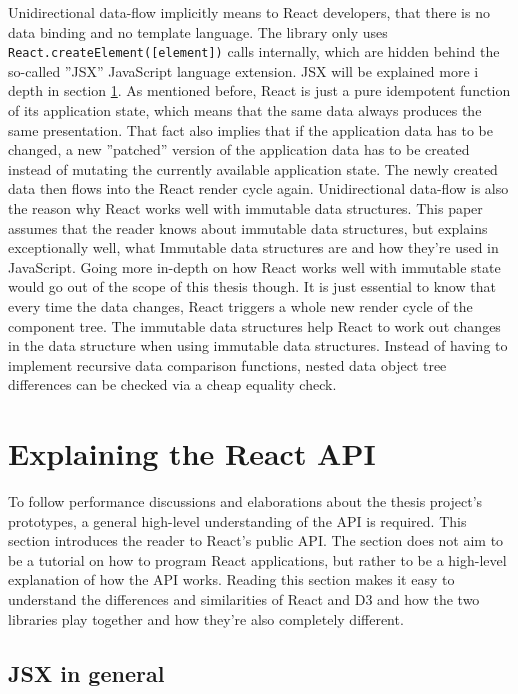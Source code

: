 Unidirectional data-flow implicitly means to React developers, that there is no data binding and no template language. The library only uses \texttt{React.createElement([element])} calls internally, which are hidden behind the so-called ''JSX'' JavaScript language extension. JSX will be explained more i depth in section \ref{sec:reactApi}. As mentioned before, React is just a pure idempotent function of its application state, which means that the same data always produces the same presentation. That fact also implies that if the application data has to be changed, a new ''patched'' version of the application data has to be created instead of mutating the currently available application state. The newly created data then flows into the React render cycle again. Unidirectional data-flow is also the reason why React works well with immutable data structures. This paper assumes that the reader knows about immutable data structures, but \cite{ImmutableJS} explains exceptionally well, what Immutable data structures are and how they're used in JavaScript. Going more in-depth on how React works well with immutable state would go out of the scope of this thesis though. It is just essential to know that every time the data changes,  React triggers a whole new render cycle of the component tree. The immutable data structures help React to work out changes in the data structure when using immutable data structures. Instead of having to implement recursive data comparison functions, nested data object tree differences can be checked via a cheap equality check.

\section{Explaining the React API}
\label{sec:reactApi}

To follow performance discussions and elaborations about the thesis project's prototypes, a general high-level understanding of the API is required. This section introduces the reader to React's public API. The section does not aim to be a tutorial on how to program React applications, but rather to be a high-level explanation of how the API works. Reading this section makes it easy to understand the differences and similarities of React and D3 and how the two libraries play together and how they're also completely different.

\subsection{JSX in general}

